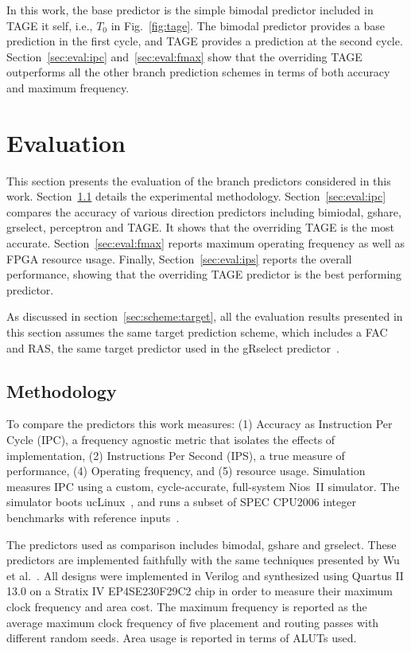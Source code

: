\documentclass[conference]{IEEEtran}
\begin{document}
In this work, the base predictor is the simple bimodal predictor included in TAGE it self, i.e., $T_0$ in Fig.~\ref{fig:tage}. The bimodal predictor provides a base prediction in the first cycle, and TAGE provides a prediction at the second cycle. Section~\ref{sec:eval:ipc} and~\ref{sec:eval:fmax} show that the overriding TAGE outperforms all the other branch prediction schemes in terms of both accuracy and maximum frequency.

\section{Evaluation}
\label{sec:eval}
This section presents the evaluation of the branch predictors considered in this work. Section~\ref{sec:eval:methodology} details the experimental
methodology. Section~\ref{sec:eval:ipc} compares the accuracy of various direction predictors including bimiodal, gshare, grselect, perceptron and TAGE. It shows that the overriding TAGE is the most accurate. Section~\ref{sec:eval:fmax} reports maximum operating frequency as well as FPGA resource usage. Finally, Section~\ref{sec:eval:ips} reports the overall performance, showing that the overriding TAGE predictor is the best performing predictor.

As discussed in section~\ref{sec:scheme:target}, all the evaluation results presented in this section assumes the same target prediction scheme, which includes a FAC and RAS, the same target predictor used in the gRselect predictor~\cite{grselect}.

\subsection{Methodology}
\label{sec:eval:methodology}
To compare the predictors this work measures: (1) Accuracy as Instruction Per Cycle (IPC), a frequency agnostic metric that isolates the effects of implementation, (2) Instructions Per Second (IPS), a true measure of performance, (4) Operating frequency, and (5) resource usage. Simulation measures IPC using a custom, cycle-accurate, full-system Nios~II simulator. The simulator boots ucLinux~\cite{uclinux}, and runs a subset of SPEC CPU2006 integer benchmarks with reference inputs~\cite{spec2k6}.

The predictors used as comparison includes bimodal, gshare and grselect. These predictors are implemented faithfully with the same techniques presented by Wu et al.~\cite{grselect}. All designs were implemented in Verilog and synthesized using Quartus II 13.0 on a Stratix IV EP4SE230F29C2 chip in order to measure their maximum clock frequency and area cost. The maximum frequency is reported as the average maximum clock frequency of five placement and routing passes with different random seeds. Area usage is reported in terms of ALUTs used.
\end{document}
